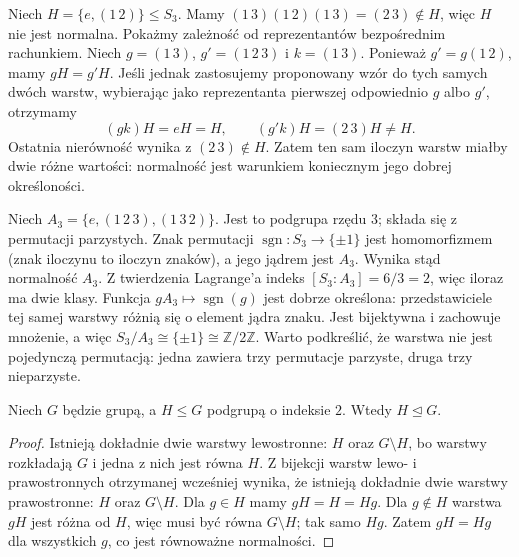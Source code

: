\begin{przyklad}
Niech $H=\{e,(1\,2)\}\le S_3$.
Mamy $(1\,3)(1\,2)(1\,3)=(2\,3)\notin H$,
więc $H$ nie jest normalna.
Pokażmy zależność od reprezentantów bezpośrednim rachunkiem.
Niech $g=(1\,3)$, $g'=(1\,2\,3)$ i $k=(1\,3)$.
Ponieważ $g'=g(1\,2)$, mamy $gH=g'H$. Jeśli jednak
zastosujemy proponowany wzór do tych samych dwóch warstw,
wybierając jako reprezentanta pierwszej odpowiednio $g$ albo $g'$,
otrzymamy
\[
(gk)H=eH=H,\qquad (g'k)H=(2\,3)H\ne H.
\]
Ostatnia nierówność wynika z $(2\,3)\notin H$.
Zatem ten sam iloczyn warstw miałby dwie różne wartości:
normalność jest warunkiem koniecznym jego dobrej określoności.
\end{przyklad}

\begin{przyklad}[Iloraz $S_3/A_3$]
Niech $A_3=\{e,(1\,2\,3),(1\,3\,2)\}$.
Jest to podgrupa rzędu $3$; składa się z permutacji parzystych.
Znak permutacji $\operatorname{sgn}:S_3\to\{\pm1\}$
jest homomorfizmem (znak iloczynu to iloczyn znaków),
a jego jądrem jest $A_3$. Wynika stąd normalność $A_3$.
Z twierdzenia Lagrange'a indeks $[S_3:A_3]=6/3=2$,
więc iloraz ma dwie klasy. Funkcja
$gA_3\mapsto\operatorname{sgn}(g)$ jest dobrze określona:
przedstawiciele tej samej warstwy różnią się o element jądra
znaku. Jest bijektywna i zachowuje mnożenie, a więc
$S_3/A_3\cong\{\pm1\}\cong\mathbb Z/2\mathbb Z$.
Warto podkreślić, że warstwa nie jest pojedynczą permutacją:
jedna zawiera trzy permutacje parzyste, druga trzy nieparzyste.
\end{przyklad}

\begin{wniosek}
\label{aa:wn:indeks-dwa}
Niech $G$ będzie grupą, a $H\le G$ podgrupą o indeksie $2$.
Wtedy $H\trianglelefteq G$.
\end{wniosek}
\begin{proof}
Istnieją dokładnie dwie warstwy lewostronne:
$H$ oraz $G\setminus H$, bo warstwy rozkładają $G$
i jedna z nich jest równa $H$.
Z bijekcji warstw lewo- i prawostronnych otrzymanej wcześniej
wynika, że istnieją dokładnie dwie warstwy prawostronne:
$H$ oraz $G\setminus H$.
Dla $g\in H$ mamy $gH=H=Hg$.
Dla $g\notin H$ warstwa $gH$ jest różna od $H$,
więc musi być równa $G\setminus H$; tak samo $Hg$.
Zatem $gH=Hg$ dla wszystkich $g$,
co jest równoważne normalności.
\end{proof}

